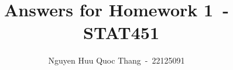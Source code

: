 \documentclass[12pt,a4paper]{article}
\begin{document}
\title{Answers for Homework 1~-~STAT451}
\author{Nguyen Huu Quoc Thang~-~22125091}

\maketitle



\end{document}
